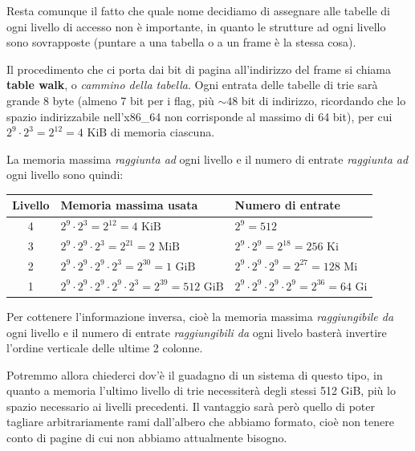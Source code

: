 \documentclass[a4paper,11pt]{article}
\begin{document}
Resta comunque il fatto che quale nome decidiamo di assegnare alle tabelle di ogni livello di accesso non è importante, in quanto le strutture ad ogni livello sono sovrapposte (puntare a una tabella o a un frame è la stessa cosa).

Il procedimento che ci porta dai bit di pagina all'indirizzo del frame si chiama \textbf{table walk}, o \textit{cammino della tabella}.
Ogni entrata delle tabelle di trie sarà grande 8 byte (almeno 7 bit per i flag, più $\sim 48$ bit di indirizzo, ricordando che lo spazio indirizzabile nell'x86\_64 non corrisponde al massimo di 64 bit), per cui $2^9 \cdot 2^3 = 2^{12} = 4\text{ KiB}$ di memoria ciascuna.

\noindent
\begin{minipage}{\textwidth}
La memoria massima \textit{raggiunta ad} ogni livello e il numero di entrate \textit{raggiunta ad} ogni livello sono quindi:

\begin{table}[H]
	\center {}
	\begin{tabular} { c | p{6cm} | p{6cm} }
		\bfseries Livello & \bfseries Memoria massima usata & \bfseries Numero di entrate \\ 
		\hline 
		4 & $2^9 \cdot 2^3 = 2^{12} = 4 \text{ KiB}$                       & $2^9 = 512$ \\
		3 & $2^9 \cdot 2^9 \cdot 2^3 = 2^{21} = 2 \text{ MiB}$             & $2^9 \cdot 2^9 = 2^{18} = 256 \text{ Ki}$ \\            
		2 & $2^9 \cdot 2^9 \cdot 2^9 \cdot 2^3 = 2^{30} = 1 \text{ GiB}$   & $2^9 \cdot 2^9 \cdot 2^9 = 2^{27} = 128 \text{ Mi}$ \\ 
		1 & $2^9 \cdot 2^9 \cdot 2^9 \cdot 2^9 \cdot 2^3 = 2^{39} = 512 \text{ GiB}$ & $2^9 \cdot 2^9 \cdot 2^9 \cdot 2^9 = 2^{36} = 64 \text{ Gi}$
	\end{tabular}
\end{table}
\end{minipage}
\par\bigskip

Per cottenere l'informazione inversa, cioè la memoria massima \textit{raggiungibile da} ogni livello e il numero di entrate \textit{raggiungibili da} ogni livelo basterà invertire l'ordine verticale delle ultime 2 colonne. 

Potremmo allora chiederci dov'è il guadagno di un sistema di questo tipo, in quanto a memoria l'ultimo livello di trie necessiterà degli stessi 512 GiB, più lo spazio necessario ai livelli precedenti.
Il vantaggio sarà però quello di poter tagliare arbitrariamente rami dall'albero che abbiamo formato, cioè non tenere conto di pagine di cui non abbiamo attualmente bisogno. 
\end{document}
